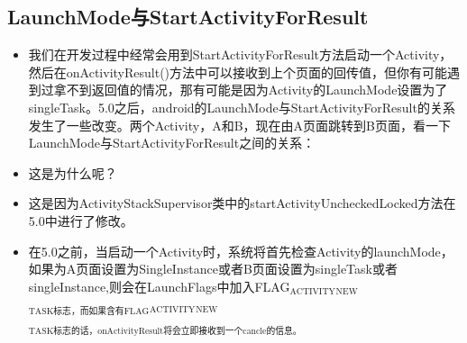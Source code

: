 \documentclass[9pt, b5paaper]{book}
\begin{document}
\subsection{LaunchMode与StartActivityForResult}
\label{sec-4-7-1}
\begin{itemize}
\item 我们在开发过程中经常会用到StartActivityForResult方法启动一个Activity，然后在onActivityResult()方法中可以接收到上个页面的回传值，但你有可能遇到过拿不到返回值的情况，那有可能是因为Activity的LaunchMode设置为了singleTask。5.0之后，android的LaunchMode与StartActivityForResult的关系发生了一些改变。两个Activity，A和B，现在由A页面跳转到B页面，看一下LaunchMode与StartActivityForResult之间的关系：
\item 这是为什么呢？
\item 这是因为ActivityStackSupervisor类中的startActivityUncheckedLocked方法在5.0中进行了修改。
\item 在5.0之前，当启动一个Activity时，系统将首先检查Activity的launchMode，如果为A页面设置为SingleInstance或者B页面设置为singleTask或者singleInstance,则会在LaunchFlags中加入FLAG$_{\text{ACTIVITY}}$$_{\text{NEW}}$$_{\text{TASK标志，而如果含有FLAG}}$$_{\text{ACTIVITY}}$$_{\text{NEW}}$$_{\text{TASK标志的话，onActivityResult将会立即接收到一个cancle的信息。}}$
\end{itemize}
\end{document}
